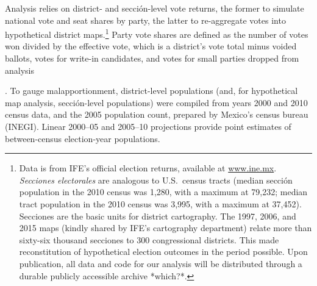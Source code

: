 \documentclass[letter,12pt]{article}
\begin{document}
Analysis relies on district- and secci\'on-level vote returns, the former to simulate national vote and seat shares by party, the latter to re-aggregate votes into hypothetical district maps.\footnote{Data is from IFE's official election returns, available at \url{www.ine.mx}. \emph{Secciones electorales} are analogous to U.S.\ census tracts (median secci\'on population in the 2010 census was 1,280, with a maximum at 79,232; median tract population in the 2010 census was 3,995, with a maximum at 37,452). Secciones are the basic units for district cartography. The 1997, 2006, and 2015 maps (kindly shared by IFE's cartography department) relate more than sixty-six thousand secciones to 300 congressional districts. This made reconstitution of hypothetical election outcomes in the period possible. Upon publication, all data and code for our analysis will be distributed through a durable publicly accessible archive *which?*.} Party vote shares are defined as the number of votes won divided by the effective vote, which is a district's vote total minus voided ballots, votes for write-in candidates, and votes for small parties dropped from analysis {\citep[cf.][:fn. 4]{linzerSeatVoteElasticity2012}. To gauge malapportionment, district-level populations (and, for hypothetical map analysis, secci\'on-level populations) were compiled from years 2000 and 2010 census data, and the 2005 population count, prepared by Mexico's census bureau (INEGI). Linear 2000--05 and 2005--10 projections provide point estimates of between-census election-year populations.

}
\end{document}
